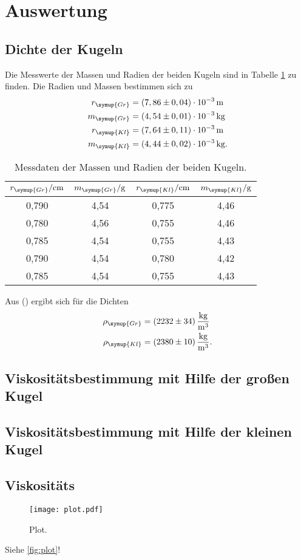 \section{Auswertung}
\label{sec:Auswertung}

\subsection{Dichte der Kugeln}
\label{sec:DichtederKugel}
Die Messwerte der Massen und Radien der beiden Kugeln sind in Tabelle \ref{tab:MasseundDichte} zu finden.
Die Radien und Massen bestimmen sich zu
\begin{align*}
  r_{\symup{Gr}} &= (7,86 \pm 0,04)\cdot 10^{-3} \,\si{\meter}\\
  m_{\symup{Gr}} &= (4,54 \pm 0,01) \cdot 10^{-3} \,\si{\kilo\gram}\\
  r_{\symup{Kl}} &= (7,64 \pm 0,11)\cdot 10^{-3} \,\si{\meter}\\
  m_{\symup{Kl}} &= (4,44 \pm 0,02) \cdot 10^{-3} \,\si{\kilo\gram}.\\
\end{align*}

\begin{table}
  \centering
  \caption{Messdaten der Massen und Radien der beiden Kugeln.}
  \label{tab:MasseundDichte}
  \begin{tabular}{c c c c}
    \toprule
    $r_{\symup{Gr}}/\unit{\centi\meter}$ & $m_{\symup{Gr}}/\unit{\gram}$ & $r_{\symup{Kl}}/\unit{\centi\meter}$ & $m_{\symup{Kl}}/\unit{\gram}$ \\
    \midrule
    0,790 & 4,54 & 0,775 & 4,46 \\
    0,780 & 4,56 & 0,755 & 4,46 \\
    0,785 & 4,54 & 0,755 & 4,43 \\
    0,790 & 4,54 & 0,780 & 4,42 \\
    0,785 & 4,54 & 0,755 & 4,43 \\
    \bottomrule
  \end{tabular}
\end{table}

Aus () ergibt sich für die Dichten
\begin{align*}
  \rho_{\symup{Gr}} &= (2232 \pm 34) \,\frac{\si{\kg}}{\si{m^3}}  \\
  \rho_{\symup{Kl}} &= (2380 \pm 10) \,\frac{\si{\kg}}{\si{m^3}}. \\
\end{align*}

\subsection{Viskositätsbestimmung mit Hilfe der großen Kugel}
\label{ViskositaetGr}

\subsection{Viskositätsbestimmung mit Hilfe der kleinen Kugel}
\label{ViskositaetKl}

\subsection{Viskositäts}


\begin{figure}
  \centering
  \texttt{[image: plot.pdf]}
  \caption{Plot.}
  \label{fig:plot}
\end{figure}


Siehe \autoref{fig:plot}!
